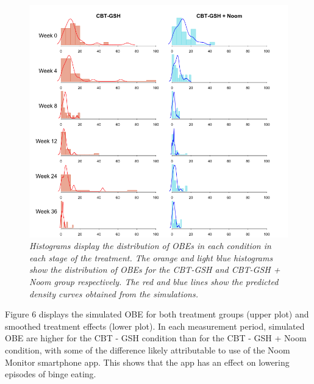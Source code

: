 \documentclass{article}
\begin{document}
\begin{figure}[H]
\centering
\includegraphics[width=\textwidth, height=\textheight, keepaspectratio]{ppc_hist_dens.png}
\caption{\emph{Histograms display the distribution of OBEs in each condition in each stage of the treatment. The orange and light blue histograms show the distribution of OBEs for the CBT-GSH and CBT-GSH  + Noom group respectively. The red and blue lines show the predicted density curves obtained from the simulations.}}
\end{figure}
Figure 6 displays the simulated OBE for both treatment groups (upper plot) and smoothed treatment effects (lower plot).  In each measurement period, simulated OBE are higher for the CBT - GSH condition than for the CBT - GSH + Noom condition, with some of the difference likely attributable to use of the Noom Monitor smartphone app.  This shows that the app has an effect on lowering episodes of binge eating.
\end{document}
